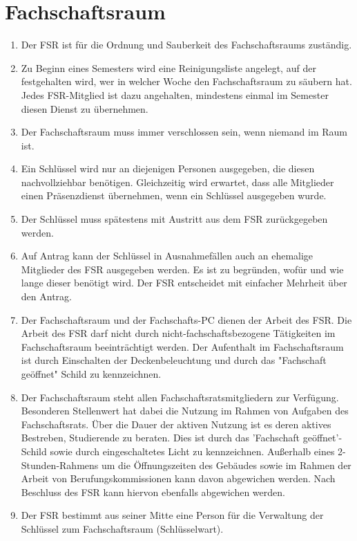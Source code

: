 \section{Fachschaftsraum}
\begin{enumerate}
	\item Der FSR ist für die Ordnung und Sauberkeit des Fachschaftsraums zuständig.
	\item Zu Beginn eines Semesters wird eine Reinigungsliste angelegt, auf der festgehalten wird, wer in welcher Woche den Fachschaftsraum zu säubern hat.
	Jedes FSR-Mitglied ist dazu angehalten, mindestens einmal im Semester diesen Dienst zu übernehmen.
	\item Der Fachschaftsraum muss immer verschlossen sein, wenn niemand im Raum ist.
	\item Ein Schlüssel wird nur an diejenigen Personen ausgegeben, die diesen nachvollziehbar benötigen.
	Gleichzeitig wird erwartet, dass alle Mitglieder einen Präsenzdienst übernehmen, wenn ein Schlüssel ausgegeben wurde.
	\item Der Schlüssel muss spätestens mit Austritt aus dem FSR zurückgegeben werden.
	\item Auf Antrag kann der Schlüssel in Ausnahmefällen auch an ehemalige Mitglieder des FSR ausgegeben werden.
	Es ist zu begründen, wofür und wie lange dieser benötigt wird.
	Der FSR entscheidet mit einfacher Mehrheit über den Antrag.
	\item Der Fachschaftsraum und der Fachschafts-PC dienen der Arbeit des FSR. Die Arbeit des FSR darf nicht durch nicht-fachschaftsbezogene Tätigkeiten im Fachschaftsraum beeinträchtigt werden. Der Aufenthalt im Fachschaftsraum ist durch Einschalten der Deckenbeleuchtung und durch das "Fachschaft geöffnet" Schild zu kennzeichnen.
	\item Der Fachschaftsraum steht allen Fachschaftsratsmitgliedern zur Verfügung. Besonderen Stellenwert hat dabei die Nutzung im Rahmen von Aufgaben des Fachschaftsrats. Über die Dauer der aktiven Nutzung ist es deren aktives Bestreben, Studierende zu beraten. Dies ist durch das 'Fachschaft geöffnet'-Schild sowie durch eingeschaltetes Licht zu kennzeichnen. Außerhalb eines 2-Stunden-Rahmens um die Öffnungszeiten des Gebäudes sowie im Rahmen der Arbeit von Berufungskommissionen kann davon abgewichen werden. Nach Beschluss des FSR kann hiervon ebenfalls abgewichen werden.
	\item Der FSR bestimmt aus seiner Mitte eine Person für die Verwaltung der Schlüssel zum Fachschaftsraum (Schlüsselwart).
\end{enumerate}

